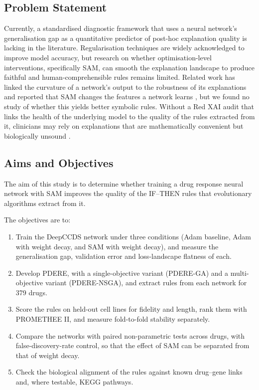 \subsection{Problem Statement}\label{sec:problem}
Currently, a standardised diagnostic framework that uses a neural network's generalisation gap as a quantitative predictor of post-hoc explanation quality is lacking in the literature. Regularisation techniques are widely acknowledged to improve model accuracy, but research on whether optimisation-level interventions, specifically SAM, can smooth the explanation landscape to produce faithful and human-comprehensible rules remains limited. Related work has linked the curvature of a network's output to the robustness of its explanations \citep{dombrowski2019} and reported that SAM changes the features a network learns \citep{springer2024}, but we found no study of whether this yields better symbolic rules. Without a Red XAI audit that links the health of the underlying model to the quality of the rules extracted from it, clinicians may rely on explanations that are mathematically convenient but biologically unsound \citep{longo2024}.

\subsection{Aims and Objectives}\label{sec:aims}
The aim of this study is to determine whether training a drug response neural network with SAM improves the quality of the IF--THEN rules that evolutionary algorithms extract from it.

The objectives are to:
\begin{enumerate}
  \item Train the DeepCCDS network under three conditions (Adam baseline, Adam with weight decay, and SAM with weight decay), and measure the generalisation gap, validation error and loss-landscape flatness of each.
  \item Develop PDERE, with a single-objective variant (PDERE-GA) and a multi-objective variant (PDERE-NSGA), and extract rules from each network for 379 drugs.
  \item Score the rules on held-out cell lines for fidelity and length, rank them with PROMETHEE II, and measure fold-to-fold stability separately.
  \item Compare the networks with paired non-parametric tests across drugs, with false-discovery-rate control, so that the effect of SAM can be separated from that of weight decay.
  \item Check the biological alignment of the rules against known drug--gene links and, where testable, KEGG pathways.
\end{enumerate}

